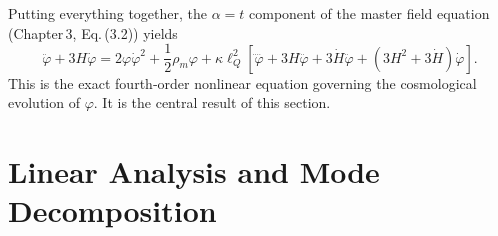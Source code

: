 \documentclass[11pt,a4paper]{article}
\begin{document}
Putting everything together, the \(\alpha = t\) component of the master field equation (Chapter 3, Eq. (3.2)) yields
\begin{equation}
\boxed{ \ddot\varphi + 3H\dot\varphi = 2\varphi \dot\varphi^2 + \frac{1}{2} \rho_m \varphi + \kappa\ell_Q^2 \left[ \ddddot\varphi + 3H \dddot\varphi + 3\dot H \ddot\varphi + (3H^2 + 3\dot H) \dot\varphi \right]. } \tag{2}
\end{equation}
This is the exact fourth‑order nonlinear equation governing the cosmological evolution of \(\varphi\). It is the central result of this section.

\section{Linear Analysis and Mode Decomposition}
\label{sec:linear}
\end{document}
